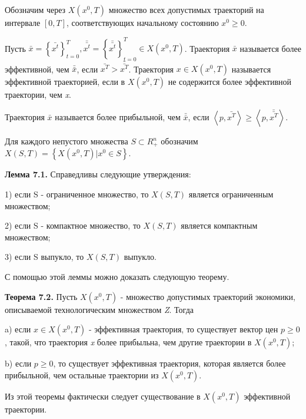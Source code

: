 \documentclass[12pt, 4paper]{book}
\begin{document}
{Обозначим через $X(x^0,T)$ множество всех допустимых траекторий на интервале $[0,T]$, соответствующих начальному состоянию $x^0 \geq 0$. 
\par

Пусть $\bar{x}=\left\{\bar{x^t}\right\}_{t=0}^{T}, \bar{\bar{x^t}} = \left\{\bar{\bar{x^t}}\right\}_{t=0}^{T} \in X(x^0,T)$. Траектория $\bar{x}$ называется более эффективной, чем $\bar{\bar{x}}$, если $\bar{x^T} > \bar{\bar{x^T}}$. Траектория $ x \in X(x^0,T)$  называется эффективной траекторией, если в $X(x^0,T)$ не содержится более эффективной траектории, чем \textit{x}.
\par

Траектория $\bar{x}$ называется более прибыльной, чем $\bar{\bar{x}}$, если $\left\langle p,\bar{x^T} \right\rangle \geq \left\langle p,\bar{\bar{x^T}}\right\rangle$.
\par

Для каждого непустого множества $S \subset R_{+}^{n}$ обозначим $X(S,T) = \left\{X (x^0,T)|x^0 \in S\right\}$.
\par

\textbf{Лемма 7.1.} Справедливы следующие утверждения: 
\par

1) если S - ограниченное множество, то $X(S,T)$ является ограниченным множеством; 
\par

2) если S - компактное множество, то $X(S,T)$ является компактным множеством; 
\par

3) если S выпукло, то $X(S,T)$ выпукло.
\par

С помощью этой леммы можно доказать следующую теорему.
\par

\textbf{Теорема 7.2.} Пусть $X(x^0,T)$ - множество допустимых траекторий экономики, описываемой технологическим множеством \textit{Z}. Тогда 
\par

a) если $x \in X(x^0,T)$ - эффективная траектория, то существует вектор цен $p \geq 0$, такой, что траектория \textit{x} более прибыльна, чем другие траектории в $X(x^0,T)$;
\par
 
b) если $p \geq 0$, то существует эффективная траектория, которая является более прибыльной, чем остальные траектории из $X(x^0,T)$.
\par
 
Из этой теоремы фактически следует существование в $X(x^0,T)$ эффективной траектории.
\par
 
}
\end{document}
